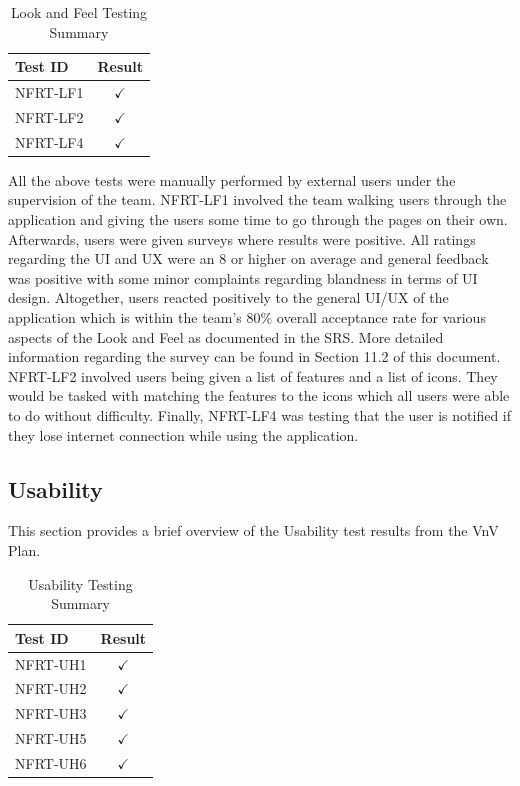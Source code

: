 \documentclass[12pt, titlepage]{article}
\begin{document}
\begin{longtable}{|l|c|}
  \caption{Look and Feel Testing Summary} \label{Look and Feel Testing Summary} \\
  \toprule
  \textbf{Test ID} & \textbf{Result} \\
  \midrule
  NFRT-LF1 & $\checkmark$ \\
  \midrule
  NFRT-LF2 & $\checkmark$ \\
  \midrule
  NFRT-LF4 & $\checkmark$ \\
  \bottomrule
\end{longtable}

All the above tests were manually performed by external users under the supervision of the team.
NFRT-LF1 involved the team walking users through the application and giving the users some time
to go through the pages on their own. Afterwards, users were given surveys where results
were positive. All ratings regarding the UI and UX were an 8 or higher on average and general feedback was positive
with some minor complaints regarding blandness in terms of UI design. Altogether, users reacted positively
to the general UI/UX of the application which is within the team's 80\% overall acceptance rate for various aspects
of the Look and Feel as documented in the SRS. More detailed information
regarding the survey can be found in Section 11.2 of this document. NFRT-LF2 involved users being given a list of features
and a list of icons. They would be tasked with matching the features to the icons which all users were
able to do without difficulty. Finally, NFRT-LF4 was testing that the user is notified if they lose internet
connection while using the application.

\subsection{Usability}

This section provides a brief overview of the Usability test results from the VnV Plan.

\begin{longtable}{|l|c|}
  \caption{Usability Testing Summary} \label{Usability Testing Summary} \\
  \toprule
  \textbf{Test ID} & \textbf{Result} \\
  \midrule
  NFRT-UH1 & $\checkmark$ \\
  \midrule
  NFRT-UH2 & $\checkmark$ \\
  \midrule
  NFRT-UH3 & $\checkmark$ \\
  \midrule
  NFRT-UH5 & $\checkmark$ \\
  \midrule
  NFRT-UH6 & $\checkmark$ \\
  \bottomrule
\end{longtable}
\end{document}
